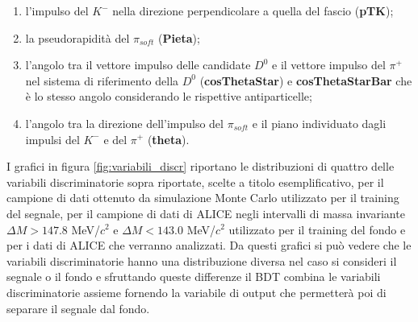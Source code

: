 \begin{enumerate}
            \item l'impulso del $K^-$ nella direzione  perpendicolare a quella del fascio (\textbf{pTK});
            \item la pseudorapidit\`a del $\pi_{soft}$ (\textbf{Pieta});
            \item l'angolo tra il vettore impulso delle candidate $D^0$ e il vettore impulso del $\pi^+$ nel sistema di riferimento della $D^0$ (\textbf{cosThetaStar}) e \textbf{cosThetaStarBar} che \`e lo stesso angolo considerando le rispettive antiparticelle;
            \item l'angolo tra la direzione dell'impulso del $\pi_{soft}$ e il piano individuato dagli impulsi del $K^-$ e del $\pi^+$ (\textbf{theta}).
            
        \end{enumerate}
       

I grafici in figura \ref{fig:variabili_discr} riportano le distribuzioni di quattro delle variabili discriminatorie sopra riportate, scelte a titolo esemplificativo, per il campione di dati ottenuto da simulazione Monte Carlo utilizzato per il training del segnale, per il campione di dati di ALICE negli intervalli di massa invariante $\Delta M > 147.8$ MeV/$c^2$  e $\Delta M < 143.0$ MeV/$c^2$ utilizzato per il training del fondo e per i dati di ALICE che verranno analizzati. Da questi grafici si può vedere che le variabili discriminatorie hanno una distribuzione diversa nel caso si consideri il segnale o il fondo e sfruttando queste differenze il BDT combina le variabili discriminatorie assieme fornendo la variabile di output che permetterà poi di separare il segnale dal fondo. 
   
